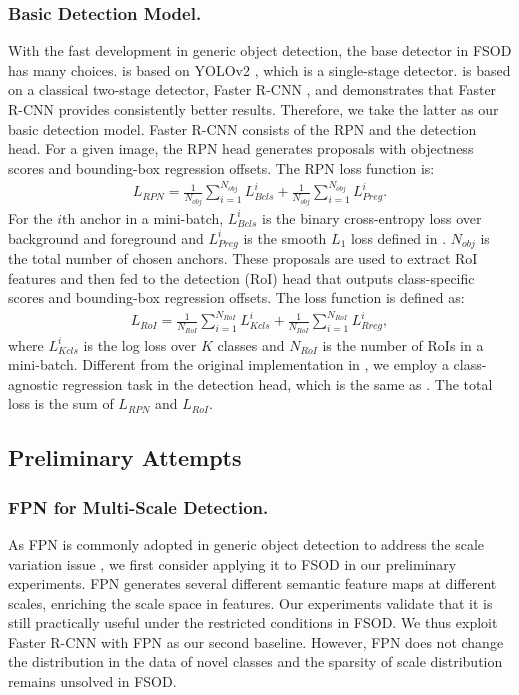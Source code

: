 \documentclass[runningheads]{llncs}
\begin{document}
\subsubsection{Basic Detection Model.}
With the fast development in generic object detection, the base detector in FSOD has many choices.
\cite{yolore} is based on YOLOv2 \cite{yolov2}, which is a single-stage 
detector.
\cite{metarcnn} is based on a classical two-stage detector, Faster R-CNN \cite{fasterrcnn}, and demonstrates that Faster R-CNN provides consistently better results.
Therefore, we take the latter as our basic detection model.
Faster R-CNN consists of the RPN and the detection head.
For a given image, the RPN head generates proposals with objectness scores and bounding-box regression offsets. 
The RPN loss function is:
\begin{align}
L_{RPN} = \frac{1}{N_{obj}}{\sum_{i = 1}^{N_{obj}}L_{Bcls}^{i}} + \frac{1}{N_{obj}}{\sum_{i = 1}^{N_{obj}}L_{Preg}^{i}}.
\end{align}
For the $i$th anchor in a mini-batch, $L_{Bcls}^{i}$ is the binary cross-entropy loss over background and foreground and $L_{Preg}^{i}$ is the smooth $L_{1}$ loss defined in \cite{fasterrcnn}. $N_{obj}$ is the total number of chosen anchors. 
These proposals are used to extract RoI features and then fed to the detection (RoI) head that outputs class-specific scores and bounding-box regression offsets. 
The loss function is defined as:
\begin{align}
L_{RoI} = \frac{1}{N_{RoI}}{\sum_{i = 1}^{N_{RoI}}L_{Kcls}^{i}} + \frac{1}{N_{RoI}}{\sum_{i = 1}^{N_{RoI}}L_{Rreg}^{i}},
\end{align}
where $L_{Kcls}^{i}$ is the log loss over $K$ classes and $N_{RoI}$ is the number of RoIs in a mini-batch. 
Different from the original implementation in \cite{fasterrcnn}, we employ a class-agnostic regression task in the detection head, which is the same as \cite{lstd}.
The total loss is the sum of $L_{RPN}$ and $L_{RoI}$.

\subsection{Preliminary Attempts}

\subsubsection{FPN for Multi-Scale Detection.}
As FPN is commonly adopted in generic object detection to address the scale variation issue \cite{fpn,cascade}, we first consider applying it to FSOD in our preliminary experiments. 
FPN generates several different semantic feature maps at different scales, enriching the scale space in features.  
Our experiments validate that it is still practically useful under the restricted conditions in FSOD. 
We thus exploit Faster R-CNN with FPN as our second baseline.
However, FPN does not change the distribution in the data of novel classes and the sparsity of scale distribution remains unsolved in FSOD.
\end{document}
